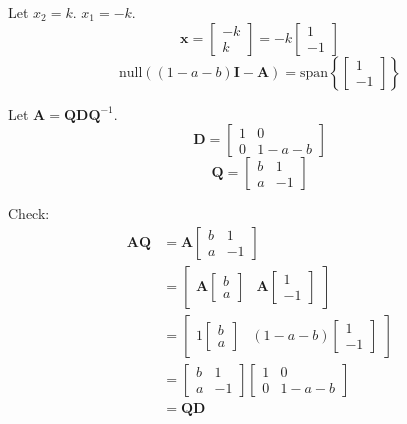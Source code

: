 \documentclass[a4paper]{article}
\newcommand{\vv}{\mathbf}
\newcommand{\nul}{\mathrm{null}}
\newcommand{\spa}{\mathrm{span}}
\begin{document}
Let \(x_2=k\). \(x_1=-k\).
\[\vv x=\begin{bmatrix}-k\\k\end{bmatrix}=-k\begin{bmatrix}1\\-1\end{bmatrix}\]
\[\nul((1-a-b)\vv I-\vv A)=\spa\left\{\begin{bmatrix}1\\-1\end{bmatrix}\right\}\]

Let \(\vv A=\vv Q\vv D\vv Q^{-1}\).
\[\vv D=\begin{bmatrix}1&0\\0&1-a-b\end{bmatrix}\]
\[\vv Q=\begin{bmatrix}b&1\\a&-1\end{bmatrix}\]

Check:
\[\begin{aligned}
	\vv A\vv Q&=\vv A
	\begin{bmatrix}
		b&1\\
		a&-1
	\end{bmatrix}\\
		  &=
	\begin{bmatrix}
		\vv A\begin{bmatrix}b\\a\end{bmatrix}&\vv A\begin{bmatrix}1\\-1\end{bmatrix}\end{bmatrix}\\
						     &=
						     \begin{bmatrix}
		1\begin{bmatrix}b\\a\end{bmatrix}&(1-a-b)\begin{bmatrix}1\\-1\end{bmatrix}
	\end{bmatrix}\\
						     &=
	\begin{bmatrix}
		b&1\\
		a&-1
	\end{bmatrix}
	\begin{bmatrix}
		1&0\\
		0&1-a-b
	\end{bmatrix}\\
						     &=\vv Q\vv D
\end{aligned}\]
\end{document}
